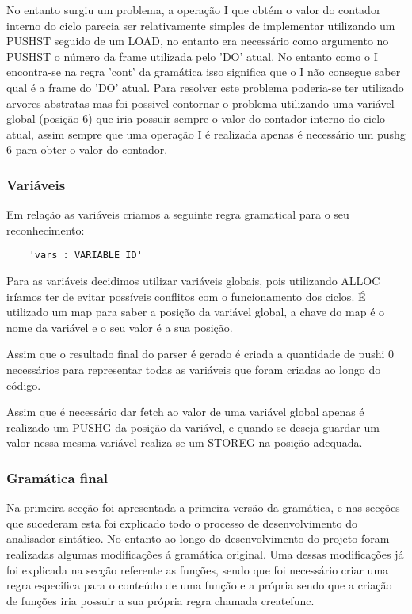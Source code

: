 \documentclass{article}
\begin{document}
No entanto surgiu um problema, a operação I que obtém o valor do contador interno do ciclo parecia ser relativamente simples de implementar utilizando um PUSHST seguido de um LOAD, no entanto era necessário como argumento no PUSHST o número da frame utilizada pelo 'DO' atual. No entanto como o I  encontra-se na regra 'cont' da gramática isso significa que o I não consegue saber qual é a frame do 'DO' atual. Para resolver este problema poderia-se ter utilizado arvores abstratas mas foi possivel contornar o problema utilizando uma variável global (posição 6) que iria possuir sempre o valor do contador interno do ciclo atual, assim sempre que uma operação I é realizada apenas é necessário um pushg 6 para obter o valor do contador.






\subsubsection{Variáveis}
Em relação as variáveis criamos a seguinte regra gramatical para o seu reconhecimento:

\begin{verbatim}
    'vars : VARIABLE ID'
\end{verbatim}

Para as variáveis decidimos utilizar variáveis globais, pois utilizando ALLOC iríamos ter de evitar possíveis conflitos com o funcionamento dos ciclos. É utilizado um map para saber a posição da variável global, a chave do map é o nome da variável e o seu valor é a sua posição. 

Assim que o resultado final do parser é gerado é criada a quantidade de pushi 0 necessários para representar todas as variáveis que foram criadas ao longo do código.

Assim que é necessário dar fetch ao valor de uma variável global apenas é realizado um PUSHG da posição da variável, e quando se deseja guardar um valor nessa mesma variável realiza-se um STOREG na posição adequada.







\subsubsection{Gramática final}
Na primeira secção foi apresentada a primeira versão da gramática, e nas secções que sucederam esta foi explicado todo o processo de desenvolvimento do analisador sintático. No entanto ao longo do desenvolvimento do projeto foram realizadas algumas modificações á gramática original. Uma dessas modificações já foi explicada na secção referente as funções, sendo que foi necessário criar uma regra especifica para o conteúdo de uma função e a própria sendo que a criação de funções iria possuir a sua própria regra chamada createfunc. 
\end{document}
